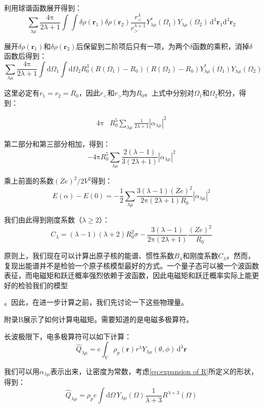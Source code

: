 \begin{booknote*}
利用球谐函数展开得到：
\[
\sum_{\lambda\mu}\frac{4\mathrm{\pi}}{2\lambda+1}\int\int\delta\rho(\boldsymbol{r}_{1})\delta\rho(\boldsymbol{r}_{2})\frac{r^{\lambda}_{<}}{r^{\lambda+1}_{>}}Y^{*}_{\lambda\mu}(\Omega_{1})Y_{\lambda\mu}(\Omega_{2})\,\mathrm{d}^{3}\boldsymbol{r}_{1}\mathrm{d}^{3}\boldsymbol{r}_{2}
\]

展开$\delta\rho(\boldsymbol{r}_{1})$和$\delta\rho(\boldsymbol{r}_{2})$后保留到二阶项后只有一项，为两个$\delta$函数的乘积，消掉$\delta$函数后得到：
\[
\sum_{\lambda\mu}\frac{4\mathrm{\pi}}{2\lambda+1}\int\mathrm{d}\Omega_{1}\int\mathrm{d}\Omega_{2}R^{3}_{0}(R(\Omega_{1})-R_{0})(R(\Omega_{2})-R_{0})Y^{*}_{\lambda\mu}(\Omega_{1})Y_{\lambda\mu}(\Omega_{2})
\]

这里必定有$r_{1}=r_{2}=R_{0}$，因此$r_{<}$和$r_{>}$均为$R_{0}$。上式中分别对$\Omega_{1}$和$\Omega_{2}$积分，得到：

\begin{align*}
4\mathrm{\pi} & R^{5}_{0}\sum_{\lambda\mu}\frac{1}{2\lambda+1}\left|\alpha_{\lambda\mu}\right|^{2}
\end{align*}

第二部分和第三部分相加，得到：
\[
-4\mathrm{\pi}R^{5}_{0}\sum_{\lambda\mu}\frac{2(\lambda-1)}{3(2\lambda+1)}\left|\alpha_{\lambda\mu}\right|^{2}
\]

乘上前面的系数$(Ze)^{2}/2V^{2}$得到：
\[
E(\alpha)-E(0)=-\frac{1}{2}\sum_{\lambda\mu}\frac{3(\lambda-1)(Ze)^{2}}{2\mathrm{\pi}(2\lambda+1)R_{0}}\left|\alpha_{\lambda\mu}\right|^{2}
\]
\end{booknote*}
我们由此得到刚度系数（$\lambda\geq2$）：
\[
C_{\lambda}=(\lambda-1)(\lambda+2)R^{2}_{0}\sigma-\frac{3(\lambda-1)}{2\mathrm{\pi}(2\lambda+1)}\frac{(Ze)^{2}}{R_{0}}
\]

原则上，我们现在可以计算出原子核的能谱、惯性系数$B_{\lambda}$和刚度系数$C_{\lambda}$。然而，复现出能谱并不是检验一个原子核模型最好的方式。一个量子态可以被一个波函数表征，而电磁矩和跃迁概率强烈依赖于波函数，因此电磁矩和跃迁概率实际上能更好的检验我们的模型

。因此，在进一步计算之前，我们先讨论一下这些物理量。

附录B展示了如何计算电磁矩。需要知道的是电磁多极算符。

长波极限下，电多极算符可以如下计算：
\[
\hat{Q}_{\lambda\mu}=e\int_{V}\rho_{p}(\boldsymbol{r})r^{\lambda}Y_{\lambda\mu}(\theta,\phi)\,\mathrm{d}^{3}\boldsymbol{r}
\]

我们可以用$\alpha_{\lambda\mu}$表示出来，让密度为常数，考虑\ref{eq:expansion of R}所定义的形状，得到：
\[
\hat{Q}_{\lambda\mu}=\rho_{p}e\int\mathrm{d}\Omega\,Y_{\lambda\mu}(\Omega)\frac{1}{\lambda+3}R^{\lambda+3}(\Omega)
\]

